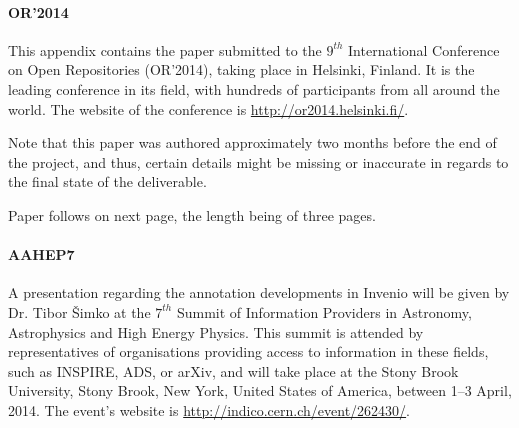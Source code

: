 
\paragraph{OR'2014} This appendix contains the paper submitted to the $9^{th}$
International Conference on Open Repositories (OR'2014), taking place in
Helsinki, Finland. It is the leading conference in its field, with hundreds of
participants from all around the world. The website of the conference is
\url{http://or2014.helsinki.fi/}.

Note that this paper was authored approximately two months before the end of
the project, and thus, certain details might be missing or inaccurate in
regards to the final state of the deliverable.

Paper follows on next page, the length being of three pages.

\paragraph{AAHEP7} A presentation regarding the annotation developments in
Invenio will be given by Dr. Tibor \v{S}imko at the $7^{th}$ Summit of
Information Providers in Astronomy, Astrophysics and High Energy Physics. This
summit is attended by representatives of organisations providing access to
information in these fields, such as INSPIRE, ADS, or arXiv, and will take
place at the Stony Brook University, Stony Brook, New York, United States of
America, between 1--3 April, 2014. The event's website is
\url{http://indico.cern.ch/event/262430/}.


